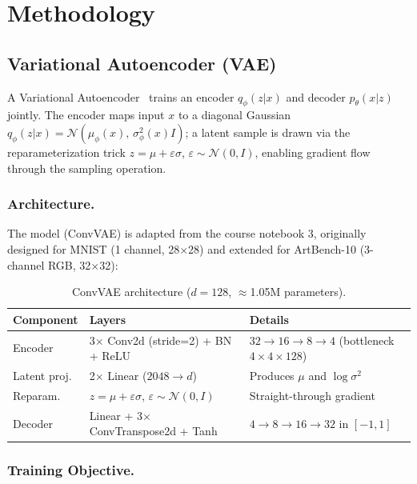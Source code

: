 \documentclass[runningheads]{llncs}
\begin{document}
\section{Methodology}\label{sec:methodology}

\subsection{Variational Autoencoder (VAE)}

A Variational Autoencoder~\cite{kingma2013} trains an encoder $q_\phi(z|x)$ and decoder $p_\theta(x|z)$ jointly. The encoder maps input $x$ to a diagonal Gaussian $q_\phi(z|x) = \mathcal{N}(\mu_\phi(x),\,\sigma^2_\phi(x)I)$; a latent sample is drawn via the reparameterization trick $z = \mu + \varepsilon\sigma$, $\varepsilon \sim \mathcal{N}(0, I)$, enabling gradient flow through the sampling operation.

\subsubsection{Architecture.}

The model (ConvVAE) is adapted from the course notebook 3, originally designed for MNIST (1 channel, 28$\times$28) and extended for ArtBench-10 (3-channel RGB, 32$\times$32):

\begin{table}[htbp]
\caption{ConvVAE architecture ($d=128$, $\approx$1.05M parameters).}\label{tab:vae_arch}
\centering
\begin{tabular}{lll}
\toprule
Component & Layers & Details \\
\midrule
Encoder   & 3$\times$ Conv2d (stride=2) + BN + ReLU & $32{\to}16{\to}8{\to}4$ (bottleneck $4{\times}4{\times}128$) \\
Latent proj. & 2$\times$ Linear ($2048 \to d$) & Produces $\mu$ and $\log\sigma^2$ \\
Reparam. & $z = \mu + \varepsilon\sigma$, $\varepsilon \sim \mathcal{N}(0,I)$ & Straight-through gradient \\
Decoder   & Linear + 3$\times$ ConvTranspose2d + Tanh & $4{\to}8{\to}16{\to}32$ in $[-1,1]$ \\
\bottomrule
\end{tabular}
\end{table}

\subsubsection{Training Objective.}
\end{document}
